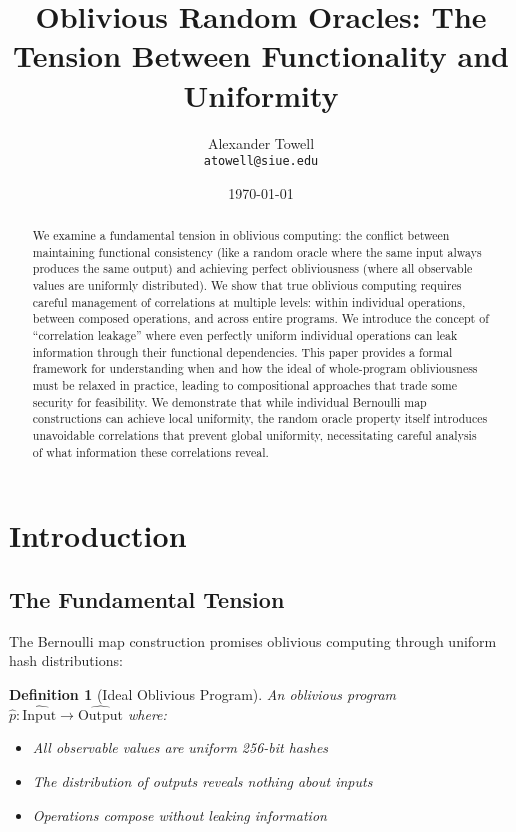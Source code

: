 \documentclass[11pt,final,hidelinks]{article}
\title{Oblivious Random Oracles: The Tension Between Functionality and Uniformity}
\author{
    Alexander Towell\\
    \texttt{atowell@siue.edu}
}
\date{\today}
\newtheorem{definition}[theorem]{Definition}
\begin{document}
\maketitle

\begin{abstract}
We examine a fundamental tension in oblivious computing: the conflict between maintaining functional consistency (like a random oracle where the same input always produces the same output) and achieving perfect obliviousness (where all observable values are uniformly distributed). We show that true oblivious computing requires careful management of correlations at multiple levels: within individual operations, between composed operations, and across entire programs. We introduce the concept of ``correlation leakage'' where even perfectly uniform individual operations can leak information through their functional dependencies. This paper provides a formal framework for understanding when and how the ideal of whole-program obliviousness must be relaxed in practice, leading to compositional approaches that trade some security for feasibility. We demonstrate that while individual Bernoulli map constructions can achieve local uniformity, the random oracle property itself introduces unavoidable correlations that prevent global uniformity, necessitating careful analysis of what information these correlations reveal.
\end{abstract}

\ObliviousNotationGuide

\section{Introduction}

\subsection{The Fundamental Tension}

The Bernoulli map construction promises oblivious computing through uniform hash distributions:

\begin{definition}[Ideal Oblivious Program]
An oblivious program $\hat{p}: \widehat{\text{Input}} \to \widehat{\text{Output}}$ where:
\begin{itemize}
    \item All observable values are uniform 256-bit hashes
    \item The distribution of outputs reveals nothing about inputs
    \item Operations compose without leaking information
\end{itemize}
\end{definition}
\end{document}
